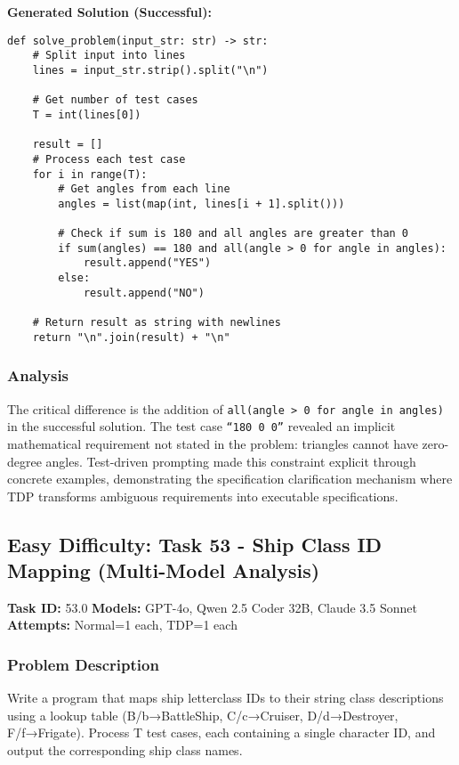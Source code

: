 \documentclass{article}
\begin{document}
\textbf{Generated Solution (Successful):}
\begin{lstlisting}
def solve_problem(input_str: str) -> str:
    # Split input into lines
    lines = input_str.strip().split("\n")

    # Get number of test cases
    T = int(lines[0])

    result = []
    # Process each test case
    for i in range(T):
        # Get angles from each line
        angles = list(map(int, lines[i + 1].split()))

        # Check if sum is 180 and all angles are greater than 0
        if sum(angles) == 180 and all(angle > 0 for angle in angles):
            result.append("YES")
        else:
            result.append("NO")

    # Return result as string with newlines
    return "\n".join(result) + "\n"

\end{lstlisting}

\subsubsection{Analysis}

The critical difference is the addition of \texttt{all(angle > 0 for angle in angles)} in the successful solution. The test case \texttt{``180 0 0''} revealed an implicit mathematical requirement not stated in the problem: triangles cannot have zero-degree angles. Test-driven prompting made this constraint explicit through concrete examples, demonstrating the specification clarification mechanism where TDP transforms ambiguous requirements into executable specifications.

\subsection{Easy Difficulty: Task 53 - Ship Class ID Mapping (Multi-Model Analysis)}
\label{appendix:task53}

\noindent \textbf{Task ID:} 53.0 \quad \textbf{Models:} GPT-4o, Qwen 2.5 Coder 32B, Claude 3.5 Sonnet \quad \textbf{Attempts:} Normal=1 each, TDP=1 each

\subsubsection{Problem Description}
Write a program that maps ship letterclass IDs to their string class descriptions using a lookup table (B/b→BattleShip, C/c→Cruiser, D/d→Destroyer, F/f→Frigate). Process T test cases, each containing a single character ID, and output the corresponding ship class names.
\end{document}
